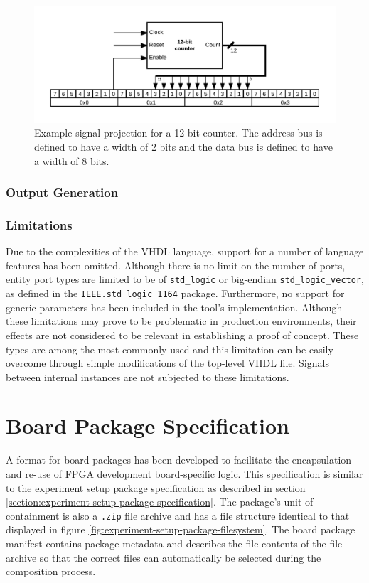 \documentclass[main.tex]{subfiles}
\begin{document}
\begin{figure}[h]
    \centering
    \caption{Example signal projection for a 12-bit counter. The address bus is defined to have a width of 2 bits and the data bus is defined to have a width of 8 bits.}
    \label{fig:signal-address-projection}
    \includegraphics[width=\textwidth]{img/signal-address-projection}
\end{figure}

\subsubsection{Output Generation}


\subsubsection{Limitations}
Due to the complexities of the VHDL language, support for a number of language features has been omitted. Although there is no limit on the number of ports, entity port types are limited to be of \texttt{std\_logic} or big-endian \texttt{std\_logic\_vector}, as defined in the \texttt{IEEE.std\_logic\_1164} package. Furthermore, no support for generic parameters has been included in the tool's implementation. Although these limitations may prove to be problematic in production environments, their effects are not considered to be relevant in establishing a proof of concept. These types are among the most commonly used and this limitation can be easily overcome through simple modifications of the top-level VHDL file. Signals between internal instances are not subjected to these limitations.


\section{Board Package Specification}
A format for board packages has been developed to facilitate the encapsulation and re-use of FPGA development board-specific logic. This specification is similar to the experiment setup package specification as described in section \ref{section:experiment-setup-package-specification}. The package's unit of containment is also a \texttt{.zip} file archive and has a file structure identical to that displayed in figure \ref{fig:experiment-setup-package-filesystem}. The board package manifest contains package metadata and describes the file contents of the file archive so that the correct files can automatically be selected during the composition process. 
\end{document}
